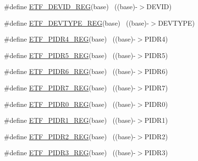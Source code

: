 \begin{DoxyCompactItemize}
\item 
\#define \hyperlink{group___e_t_f___register___accessor___macros_ga67993c3d2a89be881d7cf6e9376262dd}{E\+T\+F\+\_\+\+D\+E\+V\+I\+D\+\_\+\+R\+EG}(base)                                        ~((base)-\/$>$D\+E\+V\+ID)
\item 
\#define \hyperlink{group___e_t_f___register___accessor___macros_ga4a325b20038d673fb3ce3315d92447c8}{E\+T\+F\+\_\+\+D\+E\+V\+T\+Y\+P\+E\+\_\+\+R\+EG}(base)                                    ~((base)-\/$>$D\+E\+V\+T\+Y\+PE)
\item 
\#define \hyperlink{group___e_t_f___register___accessor___macros_gaa7e3cd7e6ebe630d04469253ef74edff}{E\+T\+F\+\_\+\+P\+I\+D\+R4\+\_\+\+R\+EG}(base)                                        ~((base)-\/$>$P\+I\+D\+R4)
\item 
\#define \hyperlink{group___e_t_f___register___accessor___macros_gad07bd35743dda4c65ffc83da3c02c1c8}{E\+T\+F\+\_\+\+P\+I\+D\+R5\+\_\+\+R\+EG}(base)                                        ~((base)-\/$>$P\+I\+D\+R5)
\item 
\#define \hyperlink{group___e_t_f___register___accessor___macros_gadb758d0aa38d644a432e5dd9978d212f}{E\+T\+F\+\_\+\+P\+I\+D\+R6\+\_\+\+R\+EG}(base)                                        ~((base)-\/$>$P\+I\+D\+R6)
\item 
\#define \hyperlink{group___e_t_f___register___accessor___macros_ga6091662320901cb89249b5e681300fd9}{E\+T\+F\+\_\+\+P\+I\+D\+R7\+\_\+\+R\+EG}(base)                                        ~((base)-\/$>$P\+I\+D\+R7)
\item 
\#define \hyperlink{group___e_t_f___register___accessor___macros_ga9e41167372f1530189363d41dbbfd95f}{E\+T\+F\+\_\+\+P\+I\+D\+R0\+\_\+\+R\+EG}(base)                                        ~((base)-\/$>$P\+I\+D\+R0)
\item 
\#define \hyperlink{group___e_t_f___register___accessor___macros_ga8b5d8e019a3a93b4a7e281b2ac481f3a}{E\+T\+F\+\_\+\+P\+I\+D\+R1\+\_\+\+R\+EG}(base)                                        ~((base)-\/$>$P\+I\+D\+R1)
\item 
\#define \hyperlink{group___e_t_f___register___accessor___macros_ga4119e645336b38b14c438854463865ab}{E\+T\+F\+\_\+\+P\+I\+D\+R2\+\_\+\+R\+EG}(base)                                        ~((base)-\/$>$P\+I\+D\+R2)
\item 
\#define \hyperlink{group___e_t_f___register___accessor___macros_ga6d9e5ced04cbea1843586e45cc8ea979}{E\+T\+F\+\_\+\+P\+I\+D\+R3\+\_\+\+R\+EG}(base)                                        ~((base)-\/$>$P\+I\+D\+R3)

\end{DoxyCompactItemize}
